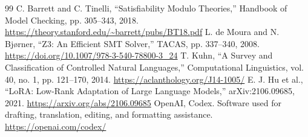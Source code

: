 \documentclass[nolineno]{ieeeaccess}
\begin{document}
\begin{thebibliography}{99}
 C. Barrett and C. Tinelli, “Satisfiability Modulo Theories,” Handbook of Model Checking, pp. 305--343, 2018. \url{https://theory.stanford.edu/~barrett/pubs/BT18.pdf}
 L. de Moura and N. Bjørner, “Z3: An Efficient SMT Solver,” TACAS, pp. 337--340, 2008. \url{https://doi.org/10.1007/978-3-540-78800-3_24}
 T. Kuhn, “A Survey and Classification of Controlled Natural Languages,” Computational Linguistics, vol. 40, no. 1, pp. 121--170, 2014. \url{https://aclanthology.org/J14-1005/}
 E. J. Hu et al., “LoRA: Low-Rank Adaptation of Large Language Models,” arXiv:2106.09685, 2021. \url{https://arxiv.org/abs/2106.09685}
 OpenAI, Codex. Software used for drafting, translation, editing, and formatting assistance. \url{https://openai.com/codex/}
\end{thebibliography}
\EOD
\end{document}
